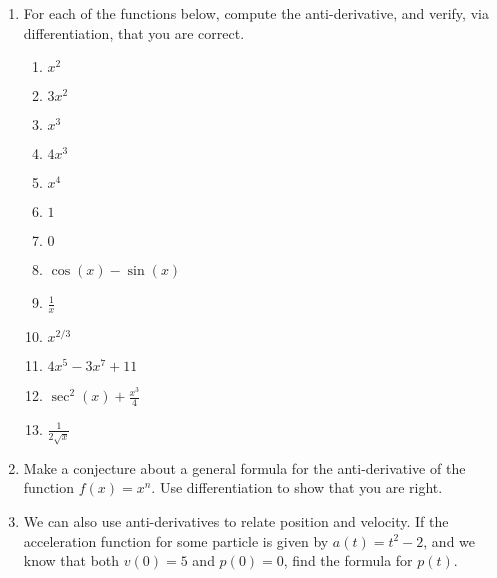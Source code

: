 \documentclass{article}
\begin{document}
\begin{enumerate}
\item For each of the functions below, compute the anti-derivative, and verify, via differentiation, that you are correct.
\begin{enumerate}
\item $x^2$
\item $3x^2$
\item $x^3$
\item $4x^3$
\item $x^4$
\item $1$
\item $0$
\item $\cos(x) - \sin(x)$
\item $\frac{1}{x}$
\item $x^{2/3}$
\item $4x^5 - 3x^7 + 11$
\item $\sec^2(x) + \frac{x^3}{4}$
\item $\frac{1}{2\sqrt{x}}$
\end{enumerate}
\item Make a conjecture about a general formula for the anti-derivative of the function $f(x) = x^n$. Use differentiation to show that you are right.
\item We can also use anti-derivatives to relate position and velocity. If the acceleration function for some particle is given by $a(t) = t^2 - 2$, and we know that both $v(0) = 5$ and $p(0) = 0$, find the formula for $p(t)$.
\end{enumerate}
\end{document}
